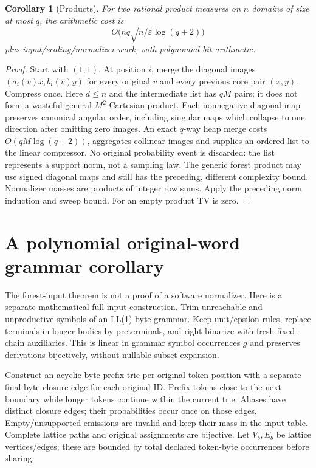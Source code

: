 \documentclass[11pt]{article}
\newtheorem{corollary}{Corollary}
\begin{document}
\begin{corollary}[Products]\label{cor:products}
For two rational product measures on $n$ domains of size at most $q$, the
arithmetic cost is
\[
 O\bigl(nq\sqrt{n/\varepsilon}\log(q+2)\bigr)
\]
plus input/scaling/normalizer work, with polynomial-bit arithmetic.
\end{corollary}
\begin{proof}
Start with $(1,1)$. At position $i$, merge the diagonal images
$(a_i(v)x,b_i(v)y)$ for every original $v$ and every previous core pair
$(x,y)$. Compress once. Here $d\leq n$ and the intermediate list has $qM$
pairs; it does not form a wasteful general $M^2$ Cartesian product.
Each nonnegative diagonal map preserves canonical angular order, including
singular maps which collapse to one direction after omitting zero images.
An exact $q$-way heap merge costs $O(qM\log(q+2))$, aggregates collinear
images and supplies an ordered list to the linear compressor. No original
probability event is discarded: the list represents a support norm, not a
sampling law. The generic forest product may use signed diagonal maps and
still has the preceding, different complexity bound.
Normalizer masses are products of integer row sums. Apply the preceding
norm induction and sweep bound. For an empty product TV is zero.
\end{proof}

\section{A polynomial original-word grammar corollary}
The forest-input theorem is not a proof of a software normalizer.
Here is a separate mathematical full-input construction. Trim unreachable
and unproductive symbols of an LL(1) byte grammar. Keep unit/epsilon rules,
replace terminals in longer bodies by preterminals, and right-binarize with
fresh fixed-chain auxiliaries. This is linear in grammar symbol occurrences
$g$ and preserves derivations bijectively, without nullable-subset expansion.

Construct an acyclic byte-prefix trie per original token position with a
separate final-byte closure edge for each original ID. Prefix tokens close
to the next boundary while longer tokens continue within the current trie.
Aliases have distinct closure edges; their probabilities occur once on those
edges. Empty/unsupported emissions are invalid and keep their mass in the
input table. Complete lattice paths and original assignments are bijective.
Let $V_b,E_b$ be lattice vertices/edges; these are bounded by total declared
token-byte occurrences before sharing.
\end{document}

